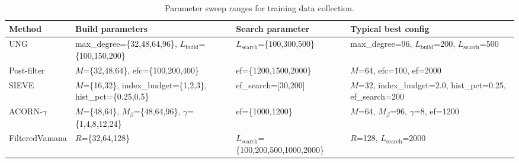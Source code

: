\begin{table}[!htbp]
\centering
\captionsetup{justification=centering, singlelinecheck=false}
\caption{Parameter sweep ranges for training data collection. %
}
\label{tab:sweep-ranges}
\small
\setlength{\tabcolsep}{4pt}
\begin{tabularx}{\textwidth}{l X X X}
\toprule
Method & Build parameters & Search parameter & Typical best config \\
\midrule
UNG            & max\_degree=\{32,48,64,96\}, $L_\text{build}$=\{100,150,200\} & $L_\text{search}$=\{100,300,500\} & max\_degree=96, $L_\text{build}$=200, $L_\text{search}$=500 \\
\midrule
Post-filter    & $M$=\{32,48,64\}, efc=\{100,200,400\} & ef=\{1200,1500,2000\} & $M$=64, efc=100, ef=2000 \\
\midrule
SIEVE          & $M$=\{16,32\}, index\_budget=\{1,2,3\}, hist\_pct=\{0.25,0.5\} & ef\_search=[30,200] & $M$=32, index\_budget=2.0, hist\_pct=0.25, ef\_search=200 \\
\midrule
ACORN-$\gamma$ & $M$=\{48,64\}, $M_\beta$=\{48,64,96\}, $\gamma$=\{1,4,8,12,24\} & ef=\{1000,1200\} & $M$=64, $M_\beta$=96, $\gamma$=8, ef=1200 \\
\midrule
FilteredVamana & $R$=\{32,64,128\} & $L_\text{search}$=\{100,200,500,1000,2000\} & $R$=128, $L_\text{search}$=2000 \\
\bottomrule
\end{tabularx}
\end{table}

